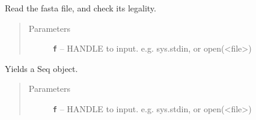\documentclass[letterpaper,10pt,english]{sphinxmanual}
\begin{document}

\begin{fulllineitems}
\label{reference/PyPretreatDNA:PyPretreatDNA.ReadFastaCheckDna}
Read the fasta file, and check its legality.
\begin{quote}\begin{description}
\item[{Parameters}] \leavevmode
\textbf{\texttt{f}} -- HANDLE to input. e.g. sys.stdin, or open(\textless{}file\textgreater{})

\end{description}\end{quote}

\end{fulllineitems}


\begin{fulllineitems}
\label{reference/PyPretreatDNA:PyPretreatDNA.ReadFastaYield}
Yields a Seq object.
\begin{quote}\begin{description}
\item[{Parameters}] \leavevmode
\textbf{\texttt{f}} -- HANDLE to input. e.g. sys.stdin, or open(\textless{}file\textgreater{})

\end{description}\end{quote}

\end{fulllineitems}


\begin{fulllineitems}
\label{reference/PyPretreatDNA:PyPretreatDNA.Seq}
\end{fulllineitems}


\begin{fulllineitems}
\label{reference/PyPretreatDNA:PyPretreatDNA.StandardDeviation}
\end{fulllineitems}
\end{document}
